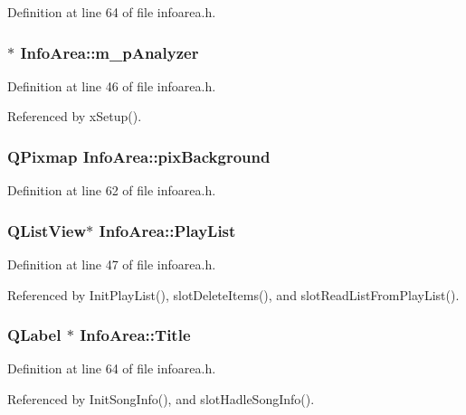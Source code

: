 Definition at line 64 of file infoarea.h.
\subsubsection{$\ast$ {\bf Info\-Area::m\_\-p\-Analyzer}}\label{classInfoArea_InfoAreao3}




Definition at line 46 of file infoarea.h.

Referenced by x\-Setup().
\subsubsection{\setlength{\rightskip}{0pt plus 5cm}QPixmap {\bf Info\-Area::pix\-Background}\hspace{0.3cm}{\tt  [private]}}\label{classInfoArea_InfoArear0}




Definition at line 62 of file infoarea.h.
\subsubsection{\setlength{\rightskip}{0pt plus 5cm}QList\-View$\ast$ {\bf Info\-Area::Play\-List}}\label{classInfoArea_InfoAreao4}




Definition at line 47 of file infoarea.h.

Referenced by Init\-Play\-List(), slot\-Delete\-Items(), and slot\-Read\-List\-From\-Play\-List().
\subsubsection{\setlength{\rightskip}{0pt plus 5cm}QLabel $\ast$ {\bf Info\-Area::Title}\hspace{0.3cm}{\tt  [private]}}\label{classInfoArea_InfoArear6}




Definition at line 64 of file infoarea.h.

Referenced by Init\-Song\-Info(), and slot\-Hadle\-Song\-Info().
